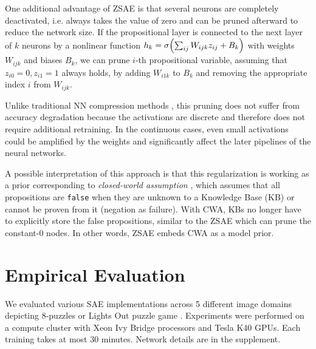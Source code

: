 One additional advantage of ZSAE is that
several neurons are completely deactivated, i.e. always takes the value of zero
and can be pruned afterward to reduce the network size.
If the propositional layer is connected to the next layer of $k$ neurons
by a nonlinear function $h_k=\sigma{\left(\sum_{ij} W_{ijk}z_{ij}+B_k\right)}$
with weights $W_{ijk}$ and biases $B_k$,
we can prune $i$-th propositional variable, assuming that $z_{i0}=0, z_{i1}=1$ always holds,
by adding $W_{i1k}$ to $B_k$ and removing the appropriate index $i$ from $W_{ijk}$.

Unlike traditional NN compression methods \cite{cheng2017survey}, this pruning does not suffer from
accuracy degradation because the activations are discrete and therefore does not require additional retraining.
In the continuous cases, even small activations could be amplified by the weights and significantly affect the
later pipelines of the neural networks.

% 
A possible interpretation of this approach 
is that
this regularization is working as a prior corresponding to \emph{closed-world assumption} \cite[CWA]{reiter1981closed},
which assumes that all propositions are \texttt{false}
when they are unknown to a Knowledge Base (KB) or cannot be proven from it (negation as failure).
With CWA, KBs no longer have to explicitly store the false propositions,
similar to the ZSAE which can prune the constant-0 nodes.
% 
In other words,
ZSAE embeds CWA as a model prior.


\section{Empirical Evaluation}
\label{evaluation}

We evaluated various SAE implementations across 5 different
image domains depicting 8-puzzles or Lights Out puzzle game \cite{lightsout}.
Experiments were performed on a compute cluster with Xeon Ivy Bridge
processors and Tesla K40 GPUs.  Each training takes at most 30 minutes.
Network details are in the supplement.

